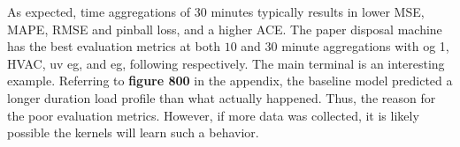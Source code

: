 As expected, time aggregations of $30$ minutes typically results in lower MSE, MAPE, RMSE and pinball loss, and a higher ACE. The paper disposal machine has the best evaluation metrics at both $10$ and $30$ minute aggregations with og 1, HVAC, uv eg, and eg, following respectively. The main terminal is an interesting example. Referring to \textbf{figure 800} in the appendix, the baseline model predicted a longer duration load profile than what actually happened. Thus, the reason for the poor evaluation metrics. However, if more data was collected, it is likely possible the kernels will learn such a behavior. 